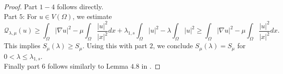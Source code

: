 \documentclass[11pt]{article}
\newcommand{\om} {\Omega}
\newcommand{\la} {\lambda}
\newcommand{\rnn}{\mathbb{R}^{N}}
\newcommand{\grad}{\nabla}
\newcommand{\Q}{\mathcal{Q}_{\la,\mu}}
\begin{document}
\begin{proof}
Part $1 - 4$ follows directly. \\
Part $5$:  For $u \in  V(\om)$, we estimate
\begin{equation*}
\Q(u) \geq \int_{\Omega} |\nabla u|^2 - \mu \int_{\Omega} \frac{|u|^2}{|x|^2} dx + \lambda_{1,s} \int_{\Omega} |u|^2 - \lambda \int_{\Omega} |u|^2 \geq \int_{\Omega} |\nabla u|^2 - \mu \int_{\Omega} \frac{|u|^2}{|x|^2}d x.
\end{equation*}
This implies $S_{\mu}(\lambda) \geq  S_{\mu}.$ Using this with part $2$, we conclude $S_{\mu}(\lambda) = S_{\mu}$ for $0 < \lambda \leq \lambda_{1, s}$.\\
Finally part $6$ follows similarly to Lemma $4.8$ in \cite{biagi2022brezis}.
\end{proof}

 
\end{document}
